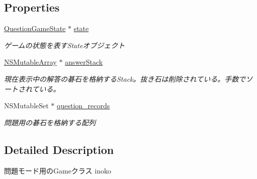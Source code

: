\subsection*{Properties}
\begin{DoxyCompactItemize}
\item 
\hypertarget{interface_question_games_a722ede5dc015760de7b4fbfe2db141c8}{
\hyperlink{interface_question_game_state}{QuestionGameState} $\ast$ \hyperlink{interface_question_games_a722ede5dc015760de7b4fbfe2db141c8}{state}}
\label{interface_question_games_a722ede5dc015760de7b4fbfe2db141c8}

\begin{DoxyCompactList}\small\item\em ゲームの状態を表すStateオブジェクト \end{DoxyCompactList}\item 
\hypertarget{interface_question_games_aeeacec3371e509446a81d54434a707db}{
\hyperlink{class_n_s_mutable_array}{NSMutableArray} $\ast$ \hyperlink{interface_question_games_aeeacec3371e509446a81d54434a707db}{answerStack}}
\label{interface_question_games_aeeacec3371e509446a81d54434a707db}

\begin{DoxyCompactList}\small\item\em 現在表示中の解答の碁石を格納するStack。抜き石は削除されている。手数でソートされている。 \end{DoxyCompactList}\item 
\hypertarget{interface_question_games_ac634f474eaa5d64159b9a67648bb14a7}{
NSMutableSet $\ast$ \hyperlink{interface_question_games_ac634f474eaa5d64159b9a67648bb14a7}{question\_\-records}}
\label{interface_question_games_ac634f474eaa5d64159b9a67648bb14a7}

\begin{DoxyCompactList}\small\item\em 問題用の碁石を格納する配列 \end{DoxyCompactList}\end{DoxyCompactItemize}


\subsection{Detailed Description}
問題モード用のGameクラス  inoko 

